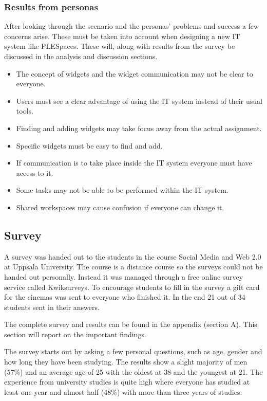 \subsubsection {Results from personas}
After looking through the scenario and the personas' problems and success a few concerns arise. These must be taken into account when designing a new IT system like PLESpaces. These will, along with results from the survey be discussed in the analysis and discussion sections.
\begin {itemize}
	\item The concept of widgets and the widget communication may not be clear to everyone.
	\item Users must see a clear advantage of using the IT system instead of their usual tools.
	\item Finding and adding widgets may take focus away from the actual assignment.
	\item Specific widgets must be easy to find and add.
	\item If communication is to take place inside the IT system everyone must have access to it.
	\item Some tasks may not be able to be performed within the IT system.
	\item Shared workspaces may cause confusion if everyone can change it.
\end {itemize}

\subsection {Survey}
A survey was handed out to the students in the course Social Media and Web 2.0 at Uppsala University. The course is a distance course so the surveys could not be handed out personally. Instead it was managed through a free online survey service called Kwiksurveys. To encourage students to fill in the survey a gift card for the cinemas was sent to everyone who finished it. In the end 21 out of 34 students sent in their answers.

The complete survey and results can be found in the appendix (section A). This section will report on the important findings.

The survey starts out by asking a few personal questions, such as age, gender and how long they have been studying. The results show a slight majority of men (57\%) and an average age of 25 with the oldest at 38 and the youngest at 21. The experience from university studies is quite high where everyone has studied at least one year and almost half (48\%) with more than three years of studies.

